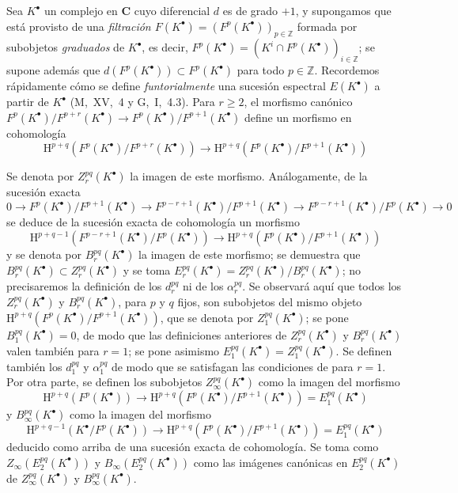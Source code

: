 \begin{env}[11.2.2]
\label{0.11.2.2}
\label{0.11.2.2-fr}
Sea $K^\bullet$ un complejo en $\boldsymbol{C}$ cuyo diferencial $d$ es de grado $+1$, y supongamos que está provisto de una \emph{filtración $F(K^\bullet)=(F^p(K^\bullet))_{p\in\mathbb Z}$} formada por subobjetos \emph{graduados}
de $K^\bullet$, es decir, $F^p(K^\bullet)=(K^i\cap F^p(K^\bullet))_{i\in\mathbb Z}$; se supone además que $d(F^p(K^\bullet))\subset F^p(K^\bullet)$ para todo $p\in\mathbb Z$.
Recordemos rápidamente cómo se define \emph{funtorialmente} una sucesión espectral $E(K^\bullet)$ a partir de $K^\bullet$ (M,~XV,~4 y G,~I,~4.3).
Para $r\geq2$, el morfismo canónico $F^p(K^\bullet)/F^{p+r}(K^\bullet)\to
F^p(K^\bullet)/F^{p+1}(K^\bullet)$ define un morfismo en cohomología
\[
  \mathrm H^{p+q}(F^p(K^\bullet)/F^{p+r}(K^\bullet))
  \longrightarrow
  \mathrm H^{p+q}(F^p(K^\bullet)/F^{p+1}(K^\bullet))
\]

Se denota por $Z_r^{pq}(K^\bullet)$ la imagen de este morfismo.
Análogamente, de la sucesión exacta
\[
  0\to F^p(K^\bullet)/F^{p+1}(K^\bullet)
  \to F^{p-r+1}(K^\bullet)/F^{p+1}(K^\bullet)
  \to F^{p-r+1}(K^\bullet)/F^p(K^\bullet)\to0
\]
se deduce de la sucesión exacta de cohomología un morfismo
\[
  \mathrm H^{p+q-1}(F^{p-r+1}(K^\bullet)/F^p(K^\bullet))
  \longrightarrow
  \mathrm H^{p+q}(F^p(K^\bullet)/F^{p+1}(K^\bullet))
\]
y se denota por $B_r^{pq}(K^\bullet)$ la imagen de este morfismo; se demuestra que $B_r^{pq}(K^\bullet)\subset Z_r^{pq}(K^\bullet)$ y se toma $E_r^{pq}(K^\bullet)=Z_r^{pq}(K^\bullet)/B_r^{pq}(K^\bullet)$; no precisaremos la definición de los $d_r^{pq}$ ni de los $\alpha_r^{pq}$. Se observará aquí que todos los $Z_r^{pq}(K^\bullet)$ y $B_r^{pq}(K^\bullet)$, para $p$ y $q$ fijos, son subobjetos del mismo objeto $\mathrm H^{p+q}(F^p(K^\bullet)/F^{p+1}(K^\bullet))$, que se denota por $Z_1^{pq}(K^\bullet)$; se pone $B_1^{pq}(K^\bullet)=0$, de modo que las definiciones anteriores de $Z_r^{pq}(K^\bullet)$ y $B_r^{pq}(K^\bullet)$ valen también para $r=1$; se pone asimismo $E_1^{pq}(K^\bullet)=Z_1^{pq}(K^\bullet)$. Se definen también los $d_1^{pq}$ y $\alpha_1^{pq}$ de modo que se satisfagan las condiciones de  para $r=1$.
Por otra parte, se definen los subobjetos $Z_\infty^{pq}(K^\bullet)$ como la imagen del morfismo
\[
  \mathrm H^{p+q}(F^p(K^\bullet))\longrightarrow
  \mathrm H^{p+q}(F^p(K^\bullet)/F^{p+1}(K^\bullet))
  =E_1^{pq}(K^\bullet)
\]
y $B_\infty^{pq}(K^\bullet)$ como la imagen del morfismo
\[
  \mathrm H^{p+q-1}(K^\bullet/F^p(K^\bullet))\longrightarrow
  \mathrm H^{p+q}(F^p(K^\bullet)/F^{p+1}(K^\bullet))
  =E_1^{pq}(K^\bullet)
\] deducido como arriba de una sucesión exacta de cohomología. Se toma como $Z_\infty(E_2^{pq}(K^\bullet))$ y $B_\infty(E_2^{pq}(K^\bullet))$ como las imágenes canónicas en $E_2^{pq}(K^\bullet)$ de $Z_\infty^{pq}(K^\bullet)$ y $B_\infty^{pq}(K^\bullet)$.


\end{env}
